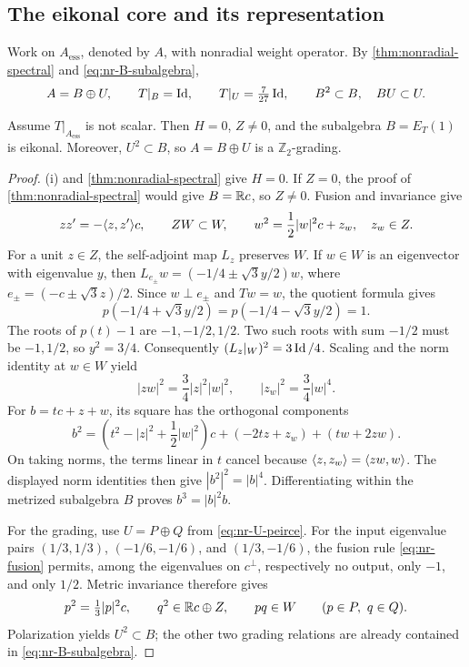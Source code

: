 \subsection{The eikonal core and its representation}
\label{subsec:nr-recovery}

Work on $A_{\mathrm{ess}}$, denoted by $A$, with nonradial weight operator.
By \cref{thm:nonradial-spectral} and \eqref{eq:nr-B-subalgebra},
\begin{equation}\label{eq:nr-recovery-splitting}
 A=B\oplus U,\qquad T|_B=\operatorname{Id},\qquad T|_U=\tfrac7{27}\operatorname{Id},
 \qquad B^2\subset B,\quad BU\subset U.
\end{equation}

\begin{proposition}\label{prop:nr-eikonal-core}
Assume $T|_{A_{\mathrm{ess}}}$ is not scalar.
Then \(H=0\), \(Z\ne0\), and the subalgebra \(B=E_T(1)\)
is eikonal. Moreover, $U^2\subset B$, so $A=B\oplus U$ is a
$\mathbb Z_2$-grading.
\end{proposition}

\begin{proof}
(i) and
\cref{thm:nonradial-spectral} give \(H=0\).
If \(Z=0\), the proof of \cref{thm:nonradial-spectral} would give
\(B=\mathbb R c\), so \(Z\ne0\). Fusion and invariance give
\[
 zz'=-\langle z,z'\rangle c,\qquad ZW\subset W,\qquad
 w^2=\frac12|w|^2c+z_w,\quad z_w\in Z.
\]
For a unit \(z\in Z\), the self-adjoint map \(L_z\) preserves
\(W\). If \(w\in W\) is an eigenvector with eigenvalue \(y\),
then \(L_{e_\pm}w=(-1/4\pm\sqrt3y/2)w\), where
\(e_\pm=(-c\pm\sqrt3z)/2\). Since \(w\perp e_\pm\) and
\(Tw=w\), the quotient formula gives
\[
 p(-1/4+\sqrt3y/2)=p(-1/4-\sqrt3y/2)=1.
\]
The roots of \(p(t)-1\) are \(-1,-1/2,1/2\). Two such roots
with sum \(-1/2\) must be \(-1,1/2\), so \(y^2=3/4\).
Consequently \((L_z|_W)^2=3\operatorname{Id}/4\).
Scaling and the norm identity at \(w\in W\) yield
\[
 |zw|^2=\frac34|z|^2|w|^2,\qquad |z_w|^2=\frac34|w|^4.
\]
For \(b=tc+z+w\), its square has the orthogonal components
\[
 b^2=\left(t^2-|z|^2+\frac12|w|^2\right)c
          +(-2tz+z_w)+(tw+2zw).
\]
On taking norms, the terms linear in \(t\) cancel because
\(\langle z,z_w\rangle=\langle zw,w\rangle\). The displayed norm identities then
give \(|b^2|^2=|b|^4\). Differentiating within the metrized
subalgebra \(B\) proves \(b^3=|b|^2b\).

For the grading, use $U=P\oplus Q$ from \eqref{eq:nr-U-peirce}.
For the input eigenvalue pairs $(1/3,1/3)$, $(-1/6,-1/6)$,
and $(1/3,-1/6)$, the fusion rule \eqref{eq:nr-fusion}
permits, among the eigenvalues on $c^\perp$, respectively no output,
only $-1$, and only $1/2$.
Metric invariance therefore gives
\[
 p^2=\tfrac13|p|^2c,\qquad q^2\in\mathbb R c\oplus Z,\qquad pq\in W
 \qquad(p\in P,\ q\in Q).
\]
Polarization yields $U^2\subset B$; the other two grading relations
are already contained in \eqref{eq:nr-B-subalgebra}.
\end{proof}

